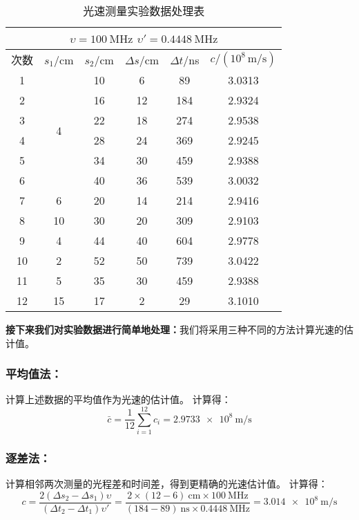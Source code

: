 \documentclass[]{../template/Report}%
\begin{document}
\begin{table}[H]
    \centering
    \caption{光速测量实验数据处理表}
    \renewcommand{\arraystretch}{1.3}
    \setlength{\tabcolsep}{8pt}
    \begin{tabular}{|c|c|c|c|c|c|}
        \hline
        \multicolumn{6}{|c|}{\textbf{$\upsilon = 100\ \mathrm{MHz}$ \quad $\upsilon' = 0.4448\ \mathrm{MHz}$}} \\
        \hline
        次数 & $s_1$/cm & $s_2$/cm & $\Delta s$/cm & $\Delta t$/ns & $c/(10^8\,\mathrm{m}/\mathrm{s})$ \\
        \hline
        1  & \multirow{6}{*}{4}  & 10 & 6  & 89  & 3.0313 \\
        2  &                      & 16 & 12 & 184 & 2.9324 \\
        3  &                      & 22 & 18 & 274 & 2.9538 \\
        4  &                      & 28 & 24 & 369 & 2.9245 \\
        5  &                      & 34 & 30 & 459 & 2.9388 \\
        6  &                      & 40 & 36 & 539 & 3.0032 \\
        \hline
        7  & 6  & 20 & 14 & 214 & 2.9416 \\
        8  & 10 & 30 & 20 & 309 & 2.9103 \\
        9  & 4  & 44 & 40 & 604 & 2.9778 \\
        10 & 2  & 52 & 50 & 739 & 3.0422 \\
        11 & 5  & 35 & 30 & 459 & 2.9388 \\
        12 & 15 & 17 & 2  & 29  & 3.1010 \\
        \hline
    \end{tabular}
\end{table}

\textbf{接下来我们对实验数据进行简单地处理：}我们将采用三种不同的方法计算光速的估计值。
\subsubsection{平均值法：}计算上述数据的平均值作为光速的估计值。
计算得：
\begin{equation}
    \bar{c} = \frac{1}{12} \sum_{i=1}^{12} c_i = \SI{2.9733e8}{\meter\per\second}
\end{equation}
\subsubsection{逐差法：}计算相邻两次测量的光程差和时间差，得到更精确的光速估计值。
计算得：
\begin{equation}
    c = \frac{2(\Delta s_2 - \Delta s_1)\upsilon }{(\Delta t_2 - \Delta t_1) \upsilon '} = \frac{2 \times (12 - 6)\ \unit{\centi\meter} \times \SI{100}{\mega\hertz}}{ (184 - 89)\ \unit{\nano\second} \times \SI{0.4448}{\mega\hertz}} = \SI{3.014e8}{\meter\per\second}
\end{equation}
\end{document}
